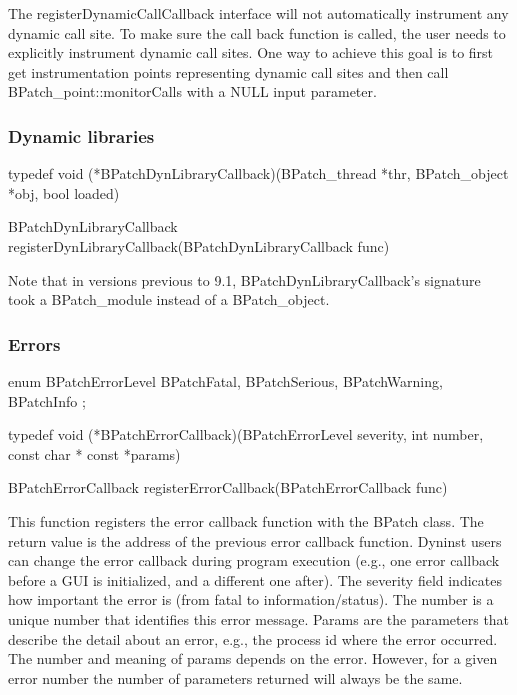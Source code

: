 \begin{apidesc}
The registerDynamicCallCallback interface will not automatically instrument any dynamic call site. To make sure the call
back function is called, the user needs to explicitly instrument dynamic call sites. One way to achieve this goal is to
first get instrumentation points representing dynamic call sites and then call BPatch_point::monitorCalls with a NULL
input parameter.
\end{apidesc}

\subsubsection{Dynamic libraries}

\begin{apient}
typedef void (*BPatchDynLibraryCallback)(BPatch_thread *thr, BPatch_object *obj, bool loaded)

BPatchDynLibraryCallback registerDynLibraryCallback(BPatchDynLibraryCallback func)
\end{apient}

\begin{apidesc}
Note that in versions previous to 9.1, BPatchDynLibraryCallback's signature took a BPatch_module
instead of a BPatch_object.
\end{apidesc}

\subsubsection{Errors}

\begin{apient}
enum BPatchErrorLevel { BPatchFatal, BPatchSerious, BPatchWarning, BPatchInfo };
\end{apient}

\begin{apient}
typedef void (*BPatchErrorCallback)(BPatchErrorLevel severity, int number, const char * const *params)
\end{apient}

\begin{apient}
BPatchErrorCallback registerErrorCallback(BPatchErrorCallback func)
\end{apient}

\begin{apidesc}
This function registers the error callback function with the BPatch class. The return value is the address of the
previous error callback function. Dyninst users can change the error callback during program execution (e.g., one error
callback before a GUI is initialized, and a different one after). The severity field indicates how important the error
is (from fatal to information/status). The number is a unique number that identifies this error message. Params are
the parameters that describe the detail about an error, e.g., the process id where the error occurred. The number and
meaning of params depends on the error. However, for a given error number the number of parameters returned will
always be the same.
\end{apidesc}


